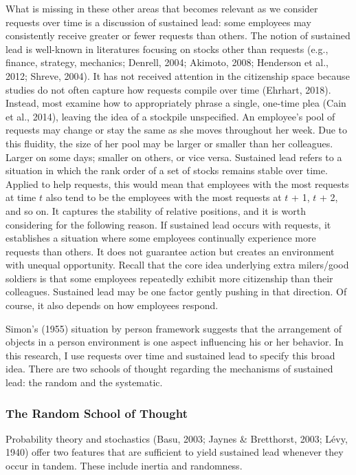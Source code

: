 \documentclass[english,,man]{apa6}
\begin{document}
What is missing in these other areas that becomes relevant as we consider requests over time is a discussion of sustained lead: some employees may consistently receive greater or fewer requests than others. The notion of sustained lead is well-known in literatures focusing on stocks other than requests (e.g., finance, strategy, mechanics; Denrell, 2004; Akimoto, 2008; Henderson et al., 2012; Shreve, 2004). It has not received attention in the citizenship space because studies do not often capture how requests compile over time (Ehrhart, 2018). Instead, most examine how to appropriately phrase a single, one-time plea (Cain et al., 2014), leaving the idea of a stockpile unspecified. An employee's pool of requests may change or stay the same as she moves throughout her week. Due to this fluidity, the size of her pool may be larger or smaller than her colleagues. Larger on some days; smaller on others, or vice versa. Sustained lead refers to a situation in which the rank order of a set of stocks remains stable over time. Applied to help requests, this would mean that employees with the most requests at time \(t\) also tend to be the employees with the most requests at \(t\) + 1, \(t\) + 2, and so on. It captures the stability of relative positions, and it is worth considering for the following reason. If sustained lead occurs with requests, it establishes a situation where some employees continually experience more requests than others. It does not guarantee action but creates an environment with unequal opportunity. Recall that the core idea underlying extra milers/good soldiers is that some employees repeatedly exhibit more citizenship than their colleagues. Sustained lead may be one factor gently pushing in that direction. Of course, it also depends on how employees respond.

Simon's (1955) situation by person framework suggests that the arrangement of objects in a person environment is one aspect influencing his or her behavior. In this research, I use requests over time and sustained lead to specify this broad idea. There are two schools of thought regarding the mechanisms of sustained lead: the random and the systematic.

\hypertarget{the-random-school-of-thought}{%
\subsubsection{The Random School of Thought}\label{the-random-school-of-thought}}

Probability theory and stochastics (Basu, 2003; Jaynes \& Bretthorst, 2003; Lévy, 1940) offer two features that are sufficient to yield sustained lead whenever they occur in tandem. These include inertia and randomness.
\end{document}

